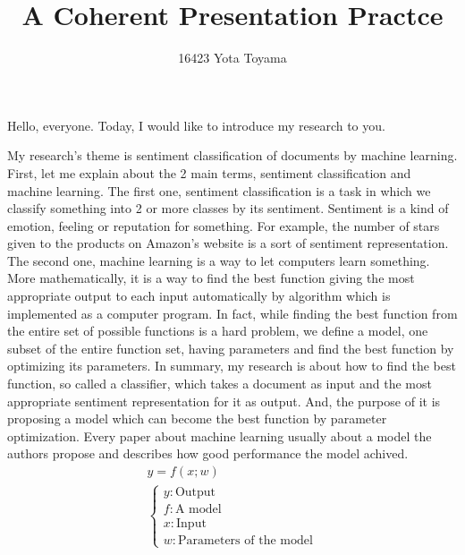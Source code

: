 \documentclass{notes}
\title{A Coherent Presentation Practce}
\author{16423 Yota Toyama}
\date{}
\begin{document}
\maketitle

Hello, everyone.
Today, I would like to introduce my research to you.

My research's theme is sentiment classification of documents
by machine learning.
First, let me explain about the 2 main terms, sentiment classification
and machine learning.
The first one, sentiment classification is a task
in which we classify something into 2 or more classes by its sentiment.
Sentiment is a kind of emotion, feeling or reputation for something.
For example, the number of stars given to the products on Amazon's website
is a sort of sentiment representation.
The second one, machine learning is a way to let computers learn something.
More mathematically, it is a way to find the best function
giving the most appropriate output to each input automatically by algorithm
which is implemented as a computer program.
In fact, while finding the best function from the entire set
of possible functions is a hard problem, we define a model,
one subset of the entire function set, having parameters
and find the best function by optimizing its parameters.
In summary, my research is about how to find the best function,
so called a classifier, which takes a document as input
and the most appropriate sentiment representation for it as output.
And, the purpose of it is proposing a model which can become the best function
by parameter optimization.
Every paper about machine learning usually about a model the authors propose
and describes how good performance the model achived.
\begin{gather*}
  y = f(x; w) \\
  \begin{cases}
    y : \text{Output} \\
    f : \text{A model} \\
    x : \text{Input} \\
    w : \text{Parameters of the model}
  \end{cases}
\end{gather*}
\end{document}
